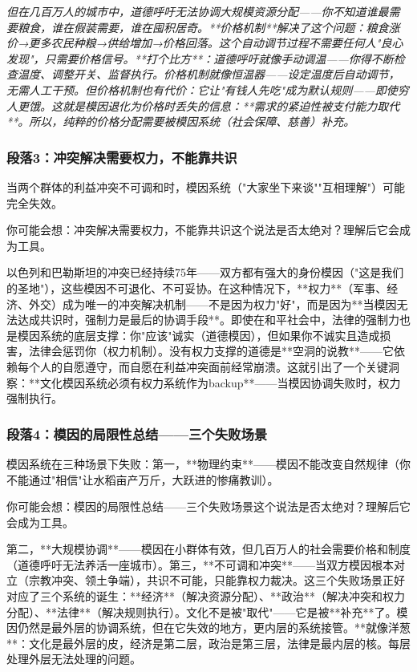 \documentclass[a4paper,12pt]{book}
\newenvironment{motivation}{\begin{tcolorbox}[colback=gray!10,colframe=gray!60,title=\textit{本章动机 (Motivation)},fonttitle=\bfseries,arc=0mm,leftrule=3mm]\small\itshape}{\end{tcolorbox}}
\begin{document}
\begin{motivation}
\begin{motivation}
\begin{motivation}
但在几百万人的城市中，道德呼吁无法协调大规模资源分配——你不知道谁最需要粮食，谁在假装需要，谁在囤积居奇。**价格机制**解决了这个问题：粮食涨价→更多农民种粮→供给增加→价格回落。这个自动调节过程不需要任何人"良心发现"，只需要价格信号。**打个比方**：道德呼吁就像手动调温——你得不断检查温度、调整开关、监督执行。价格机制就像恒温器——设定温度后自动调节，无需人工干预。但价格机制也有代价：它让"有钱人先吃"成为默认规则——即使穷人更饿。这就是模因退化为价格时丢失的信息：**需求的紧迫性被支付能力取代**。所以，纯粹的价格分配需要被模因系统（社会保障、慈善）补充。

	\subsubsection*{段落3：冲突解决需要权力，不能靠共识}
	当两个群体的利益冲突不可调和时，模因系统（"大家坐下来谈""互相理解"）可能完全失效。
	\begin{tcolorbox}[colback=yellow!5, title=\textit{读者行为预测}]
		你可能会想：冲突解决需要权力，不能靠共识这个说法是否太绝对？理解后它会成为工具。
	\end{tcolorbox}

以色列和巴勒斯坦的冲突已经持续75年——双方都有强大的身份模因（"这是我们的圣地"），这些模因不可退化、不可妥协。在这种情况下，**权力**（军事、经济、外交）成为唯一的冲突解决机制——不是因为权力"好"，而是因为**当模因无法达成共识时，强制力是最后的协调手段**。即使在和平社会中，法律的强制力也是模因系统的底层支撑：你"应该"诚实（道德模因），但如果你不诚实且造成损害，法律会惩罚你（权力机制）。没有权力支撑的道德是**空洞的说教**——它依赖每个人的自愿遵守，而自愿在利益冲突面前经常崩溃。这就引出了一个关键洞察：**文化模因系统必须有权力系统作为backup**——当模因协调失败时，权力强制执行。

	\subsubsection*{段落4：模因的局限性总结——三个失败场景}
	模因系统在三种场景下失败：第一，**物理约束**——模因不能改变自然规律（你不能通过"相信"让水稻亩产万斤，大跃进的惨痛教训）。
	\begin{tcolorbox}[colback=yellow!5, title=\textit{读者行为预测}]
		你可能会想：模因的局限性总结——三个失败场景这个说法是否太绝对？理解后它会成为工具。
	\end{tcolorbox}

第二，**大规模协调**——模因在小群体有效，但几百万人的社会需要价格和制度（道德呼吁无法养活一座城市）。第三，**不可调和冲突**——当双方模因根本对立（宗教冲突、领土争端），共识不可能，只能靠权力裁决。这三个失败场景正好对应了三个系统的诞生：**经济**（解决资源分配）、**政治**（解决冲突和权力分配）、**法律**（解决规则执行）。文化不是被"取代"——它是被**补充**了。模因仍然是最外层的协调系统，但在它失效的地方，更内层的系统接管。**就像洋葱**：文化是最外层的皮，经济是第二层，政治是第三层，法律是最内层的核。每层处理外层无法处理的问题。


\end{motivation}
\end{motivation}
\end{motivation}
\end{document}
